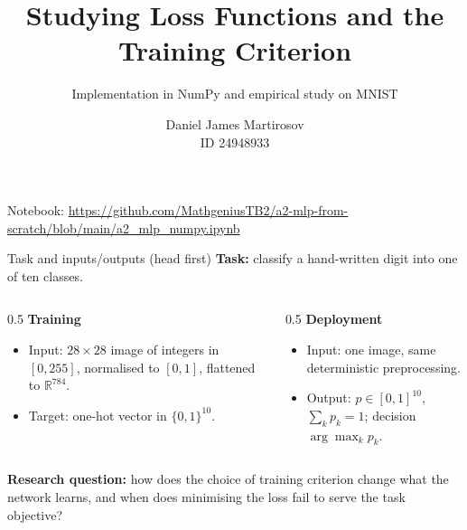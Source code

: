 \documentclass[aspectratio=169,11pt]{beamer}
\title[MLP from Scratch]{Studying Loss Functions and the Training Criterion}
\subtitle{Implementation in NumPy and empirical study on MNIST}
\author[Martirosov]{Daniel James Martirosov\\ \small ID 24948933 \quad 2026}
\institute[A2]{Advanced Data Analytics Algorithms, Machine Learning\\ Assessment Task 2}
\date{}
\begin{document}
\begin{frame}
  \titlepage
  \begin{center}
  \footnotesize
  Notebook: \url{https://github.com/MathgeniusTB2/a2-mlp-from-scratch/blob/main/a2_mlp_numpy.ipynb}
  \end{center}
\end{frame}

\begin{frame}{Task and inputs/outputs (head first)}
  \textbf{Task:} classify a hand-written digit into one of ten classes.
  \vspace{0.4em}
  \begin{columns}[T]
    \begin{column}{0.5\textwidth}
      \textbf{Training}
      \begin{itemize}
        \item Input: $28\times28$ image of integers in $[0,255]$, normalised to $[0,1]$, flattened to $\mathbb{R}^{784}$.
        \item Target: one-hot vector in $\{0,1\}^{10}$.
      \end{itemize}
    \end{column}
    \begin{column}{0.5\textwidth}
      \textbf{Deployment}
      \begin{itemize}
        \item Input: one image, same deterministic preprocessing.
        \item Output: $p\in[0,1]^{10}$, $\sum_k p_k=1$; decision $\arg\max_k p_k$.
      \end{itemize}
    \end{column}
  \end{columns}
  \vspace{0.5em}
  \textbf{Research question:} how does the choice of training criterion change what the network
  learns, and when does minimising the loss fail to serve the task objective?
\end{frame}
\end{document}
